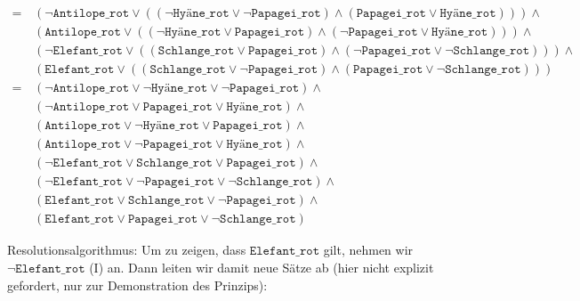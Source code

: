 \documentclass[a4paper,draft=false,oneside,12pt,ngerman]{scrreprt}
\begin{document}
\begin{align*}
        =\, & 
            (\neg \texttt{Antilope\_rot} \lor ( 
                (\neg \texttt{Hyäne\_rot} \lor \neg \texttt{Papagei\_rot}) \land
                (\texttt{Papagei\_rot} \lor \texttt{Hyäne\_rot})
            )) \land \\ &
            (\texttt{Antilope\_rot} \lor ( 
                (\neg\texttt{Hyäne\_rot} \lor \texttt{Papagei\_rot}) \land
                (\neg \texttt{Papagei\_rot} \lor \texttt{Hyäne\_rot})
            )) \land \\ &
            (\neg \texttt{Elefant\_rot} \lor (
                (\texttt{Schlange\_rot} \lor \texttt{Papagei\_rot}) \land
                (\neg \texttt{Papagei\_rot} \lor \neg \texttt{Schlange\_rot})
            )) \land \\ &
            (\texttt{Elefant\_rot} \lor ( 
                (\texttt{Schlange\_rot} \lor \neg \texttt{Papagei\_rot}) \land
                (\texttt{Papagei\_rot} \lor \neg \texttt{Schlange\_rot})
            )) \\
        =\, & 
            (\neg \texttt{Antilope\_rot} \lor \neg \texttt{Hyäne\_rot} \lor \neg \texttt{Papagei\_rot}) \land \tag{A} \\ &
            (\neg \texttt{Antilope\_rot} \lor \texttt{Papagei\_rot} \lor \texttt{Hyäne\_rot}) \land \tag{B} \\ &
            (\texttt{Antilope\_rot} \lor \neg\texttt{Hyäne\_rot} \lor \texttt{Papagei\_rot}) \land \tag{C} \\ &
            (\texttt{Antilope\_rot} \lor \neg \texttt{Papagei\_rot} \lor \texttt{Hyäne\_rot}) \land \tag{D} \\ &
            (\neg \texttt{Elefant\_rot} \lor \texttt{Schlange\_rot} \lor \texttt{Papagei\_rot}) \land \tag{E} \\ &
            (\neg \texttt{Elefant\_rot} \lor \neg \texttt{Papagei\_rot} \lor \neg \texttt{Schlange\_rot}) \land \tag{F} \\ &
            (\texttt{Elefant\_rot} \lor \texttt{Schlange\_rot} \lor \neg \texttt{Papagei\_rot}) \land \tag{G} \\ &
            (\texttt{Elefant\_rot} \lor \texttt{Papagei\_rot} \lor \neg \texttt{Schlange\_rot}) \tag{H}
\end{align*}

Resolutionsalgorithmus: Um zu zeigen, dass $ \texttt{Elefant\_rot} $ gilt, nehmen
wir $ \neg \texttt{Elefant\_rot} $ (I) an. Dann leiten wir damit neue Sätze ab
(hier nicht explizit gefordert, nur zur Demonstration des Prinzips):
\end{document}
